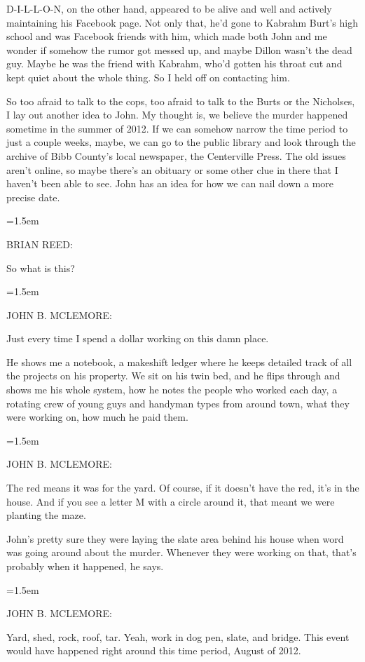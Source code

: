 \documentclass[10pt,a4paper]{article}
\newcommand{\speakerlabel}[1]{{\plantin\color{speakerblue}\MakeUppercase{#1}:}}
\newenvironment{speech}[1]{%
		\par\medskip
		\begin{list}{}{%
			\leftmargin=1.5em
			\rightmargin=0pt
			\topsep=0pt
			\partopsep=0pt
			\parsep=0.5\baselineskip
			\itemsep=0pt}%
		\item\speakerlabel{#1}\enspace\ignorespaces
	}{\end{list}}
\newenvironment{narration}[1]{%
		\par\medskip\noindent\speakerlabel{#1}\enspace\ignorespaces
	}{\par\medskip}
\begin{document}
\begin{narration}{BRIAN REED}
D-I-L-L-O-N, on the other hand, appeared to be alive and well and actively maintaining his Facebook page. Not only that, he'd gone to Kabrahm Burt's high school and was Facebook friends with him, which made both John and me wonder if somehow the rumor got messed up, and maybe Dillon wasn't the dead guy. Maybe he was the friend with Kabrahm, who'd gotten his throat cut and kept quiet about the whole thing. So I held off on contacting him.

So too afraid to talk to the cops, too afraid to talk to the Burts or the Nicholses, I lay out another idea to John. My thought is, we believe the murder happened sometime in the summer of 2012. If we can somehow narrow the time period to just a couple weeks, maybe, we can go to the public library and look through the archive of Bibb County's local newspaper, the Centerville Press. The old issues aren't online, so maybe there's an obituary or some other clue in there that I haven't been able to see. John has an idea for how we can nail down a more precise date.
\end{narration}
\begin{speech}{BRIAN REED}
So what is this?
\end{speech}
\begin{speech}{JOHN B. McLEMORE}
Just every time I spend a dollar working on this damn place.
\end{speech}
\begin{narration}{BRIAN REED}
He shows me a notebook, a makeshift ledger where he keeps detailed track of all the projects on his property. We sit on his twin bed, and he flips through and shows me his whole system, how he notes the people who worked each day, a rotating crew of young guys and handyman types from around town, what they were working on, how much he paid them.
\end{narration}
\begin{speech}{JOHN B. McLEMORE}
The red means it was for the yard. Of course, if it doesn't have the red, it's in the house. And if you see a letter M with a circle around it, that meant we were planting the maze.
\end{speech}
\begin{narration}{BRIAN REED}
John's pretty sure they were laying the slate area behind his house when word was going around about the murder. Whenever they were working on that, that's probably when it happened, he says.
\end{narration}
\begin{speech}{JOHN B. McLEMORE}
Yard, shed, rock, roof, tar. Yeah, work in dog pen, slate, and bridge. This event would have happened right around this time period, August of 2012.
\end{speech}
\end{document}
